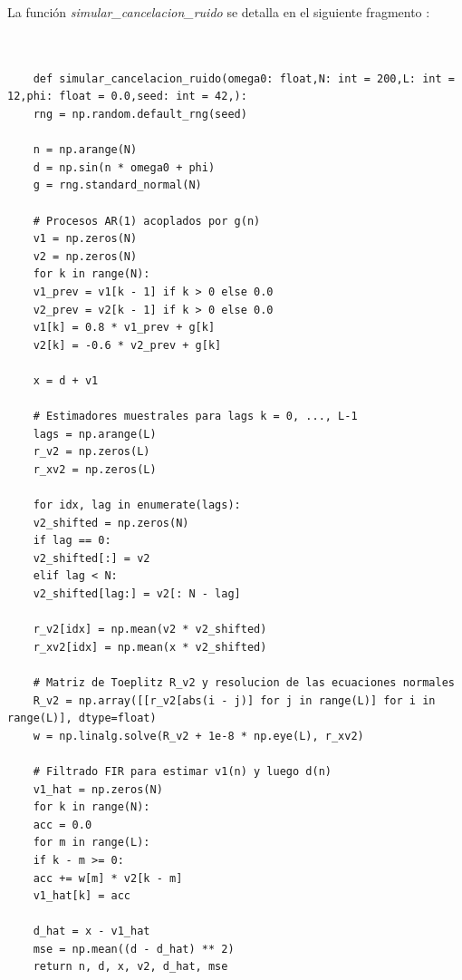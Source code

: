 \documentclass[a4paper]{article}
\begin{document}
 La función \textit{simular\_cancelacion\_ruido} se detalla en el siguiente fragmento :
 
 
 
 
 \begin{lstlisting}[caption={Librerias utilizadas}, label={lst:wiener_ar1}]
 	
 	
 	def simular_cancelacion_ruido(omega0: float,N: int = 200,L: int = 12,phi: float = 0.0,seed: int = 42,):
 	rng = np.random.default_rng(seed)
 	
 	n = np.arange(N)
 	d = np.sin(n * omega0 + phi)
 	g = rng.standard_normal(N)
 	
 	# Procesos AR(1) acoplados por g(n)
 	v1 = np.zeros(N)
 	v2 = np.zeros(N)
 	for k in range(N):
 	v1_prev = v1[k - 1] if k > 0 else 0.0
 	v2_prev = v2[k - 1] if k > 0 else 0.0
 	v1[k] = 0.8 * v1_prev + g[k]
 	v2[k] = -0.6 * v2_prev + g[k]
 	
 	x = d + v1
 	
 	# Estimadores muestrales para lags k = 0, ..., L-1
 	lags = np.arange(L)
 	r_v2 = np.zeros(L)
 	r_xv2 = np.zeros(L)
 	
 	for idx, lag in enumerate(lags):
 	v2_shifted = np.zeros(N)
 	if lag == 0:
 	v2_shifted[:] = v2
 	elif lag < N:
 	v2_shifted[lag:] = v2[: N - lag]
 	
 	r_v2[idx] = np.mean(v2 * v2_shifted)
 	r_xv2[idx] = np.mean(x * v2_shifted)
 	
 	# Matriz de Toeplitz R_v2 y resolucion de las ecuaciones normales
 	R_v2 = np.array([[r_v2[abs(i - j)] for j in range(L)] for i in range(L)], dtype=float)
 	w = np.linalg.solve(R_v2 + 1e-8 * np.eye(L), r_xv2)
 	
 	# Filtrado FIR para estimar v1(n) y luego d(n)
 	v1_hat = np.zeros(N)
 	for k in range(N):
 	acc = 0.0
 	for m in range(L):
 	if k - m >= 0:
 	acc += w[m] * v2[k - m]
 	v1_hat[k] = acc
 	
 	d_hat = x - v1_hat
 	mse = np.mean((d - d_hat) ** 2)
 	return n, d, x, v2, d_hat, mse
 \end{lstlisting}
 
 
\end{document}
